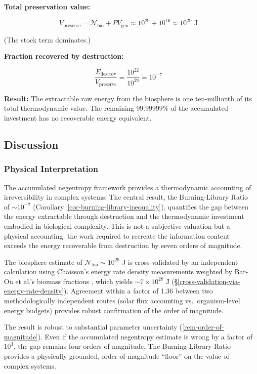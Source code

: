 \documentclass[11pt]{article}
\theoremstyle{plain}
\theoremstyle{definition}
\theoremstyle{remark}
\let\origsubsection\subsection
\renewcommand{\subsection}{\needspace{7\baselineskip}\origsubsection}
\let\origsubsubsection\subsubsection
\renewcommand{\subsubsection}{\needspace{4\baselineskip}\origsubsubsection}
\begin{document}
\textbf{Total preservation value:}

\[V_{\text{preserve}} = \mathcal{N}_{\text{bio}} + PV_{\text{gen}} \approx 10^{29} + 10^{16} \approx 10^{29} \text{ J}\]

(The stock term dominates.)

\textbf{Fraction recovered by destruction:}

\[\frac{E_{\text{destroy}}}{V_{\text{preserve}}} = \frac{10^{22}}{10^{29}} = 10^{-7}\]

\textbf{Result:} The extractable raw energy from the biosphere is one
ten-millionth of its total thermodynamic value. The remaining 99.99999\%
of the accumulated investment has no recoverable energy equivalent.

\subsection{Discussion}\label{discussion-2}

\subsubsection{Physical Interpretation}\label{physical-interpretation-3}

The accumulated negentropy framework provides a thermodynamic accounting
of irreversibility in complex systems. The central result, the
Burning-Library Ratio of \(\sim 10^{-7}\)
(Corollary~\ref{cor-burning-library-inequality}), quantifies the gap
between the energy extractable through destruction and the thermodynamic
investment embodied in biological complexity. This is not a subjective
valuation but a physical accounting: the work required to recreate the
information content exceeds the energy recoverable from destruction by
seven orders of magnitude.

The biosphere estimate of \(\mathcal{N}_{\text{bio}} \sim 10^{29}\) J is
cross-validated by an independent calculation using Chaisson's energy
rate density measurements \citep{Chaisson2011} weighted by Bar-On et
al.'s biomass fractions \citep{BarOn2018}, which yields
\(\sim 7 \times 10^{28}\) J
(§\ref{cross-validation-via-energy-rate-density}). Agreement within a
factor of 1.36 between two methodologically independent routes (solar
flux accounting vs.~organism-level energy budgets) provides robust
confirmation of the order of magnitude.

The result is robust to substantial parameter uncertainty
(\ref{rem-order-of-magnitude}). Even if the accumulated negentropy
estimate is wrong by a factor of \(10^3\), the gap remains four orders
of magnitude. The Burning-Library Ratio provides a physically grounded,
order-of-magnitude ``floor'' on the value of complex systems.
\end{document}
